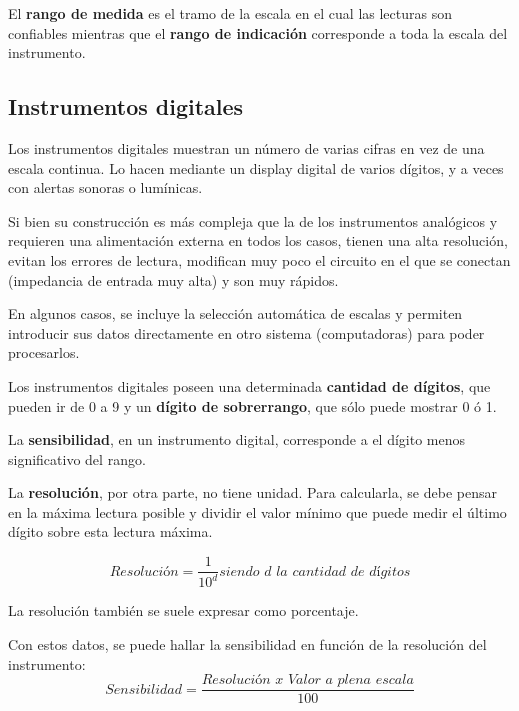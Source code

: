 \begin{ejemplo}
El \textbf{rango de medida} es el tramo de la escala en el cual las lecturas son confiables mientras que el \textbf{rango de indicación} corresponde a toda la escala del instrumento.

\subsection{Instrumentos digitales}
	
Los instrumentos digitales muestran un número de varias cifras en vez de una escala continua. Lo hacen mediante un display digital de varios dígitos, y a veces con alertas sonoras o lumínicas.

Si bien su construcción es más compleja que la de los instrumentos analógicos y requieren una alimentación externa en todos los casos, tienen una alta resolución, evitan los errores de lectura, modifican muy poco el circuito en el que se conectan (impedancia de entrada muy alta) y son muy rápidos.

En algunos casos, se incluye la selección automática de escalas y permiten introducir sus datos directamente en otro sistema (computadoras) para poder procesarlos.

Los instrumentos digitales poseen una determinada \textbf{cantidad de dígitos}, que pueden ir de 0 a 9 y un \textbf{dígito de sobrerrango}, que sólo puede mostrar 0 ó 1.

La \textbf{sensibilidad}, en un instrumento digital, corresponde a el dígito menos significativo del rango.

La \textbf{resolución}, por otra parte, no tiene unidad. Para calcularla, se debe pensar en la máxima lectura posible y dividir el valor mínimo que puede medir el último dígito sobre esta lectura máxima.

$$ \textit{Resolución} = \frac{1}{10^{d}} \textit{siendo $d$ la cantidad de dígitos}$$

La resolución también se suele expresar como porcentaje.

Con estos datos, se puede hallar la sensibilidad en función de la resolución del instrumento:
$$ Sensibilidad = \frac{\textit{Resolución x Valor a plena escala}}{100} $$
\end{ejemplo}